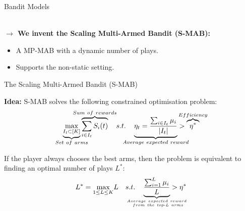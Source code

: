 \documentclass[16pt,usenames,dvipsnames, notheorems]{beamer}
\theoremstyle{definition}
\theoremstyle{example}
\theoremstyle{plain}
\begin{document}
\begin{frame}{Bandit Models}
{~\\
\pause
\textbf{$\rightarrow$ We invent the Scaling Multi-Armed Bandit (S-MAB):}
\begin{itemize}
	\item A MP-MAB with a dynamic number of plays.
	\item Supports the non-static setting.
\end{itemize}
}

\end{frame}

\begin{frame}{The Scaling Multi-Armed Bandit (S-MAB)}

\textbf{Idea:} S-MAB solves the following constrained optimisation problem:
\begin{equation}
\underbrace{\underset{I_t \subset [K]}{\max}}_{\mathclap{Set~of~arms}} \overbrace{\sum_{i \in I_t} S_i(t)}^{\mathclap{Sum~of~rewards}} \quad s.t. \quad \underbrace{\eta_t = \frac{\sum_{i \in I_t} \mu_i}{|I_t|}}_{\mathclap{Average~expected~reward}}  > \overbrace{\eta^*}^{\mathclap{Efficiency}} 
\label{eq1}
\end{equation} 

\pause 
If the player always chooses the best arms, then the problem is equivalent to finding an optimal number of plays $L^*$: 
\begin{equation} \label{eq2}
L^* = \underset{{1 \leq L \leq K}}{\max}{L} 
\quad s.t. \quad \underbrace{\frac{\sum_{i=1}^{L} \mu_i}{L}}_{\mathclap{Average~expected~reward\atop~from~the~top\text{-}L~arms}} > \eta^*
\end{equation}
\end{frame}
\end{document}
